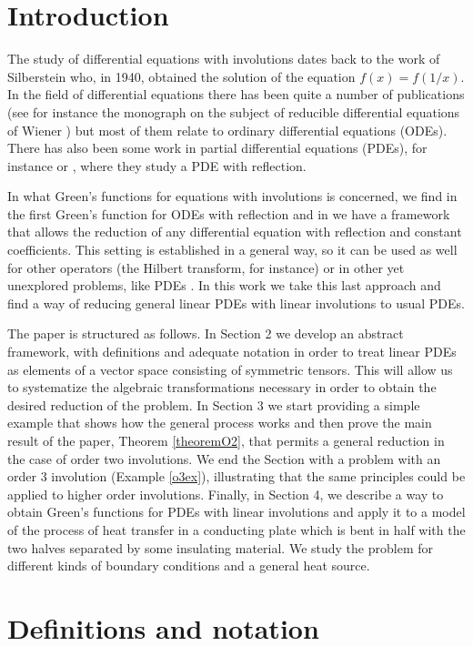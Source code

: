 \documentclass[a4paper,12pt,onecolumn]{article}
\theoremstyle{ptheorem}
\theoremstyle{hdef}
\theoremstyle{premark}
\numberwithin{equation}{section}
\numberwithin{figure}{section}
\newcommand{\<}{\langle}
\renewcommand{\>}{\rangle}
\renewcommand{\<}{\left<}
\renewcommand{\>}{\right>}
\renewcommand{\(}{\left(}
\renewcommand{\)}{\right)}
\begin{document}
\section{Introduction}
The study of differential equations with involutions dates back to the work of Silberstein \cite{Sil} who, in 1940, obtained the solution of the equation $f(x)=f(1/x)$. In the field of differential equations there has been quite a number of publications (see for instance the monograph on the subject of reducible differential equations of Wiener \cite{Wie2}) but most of them relate to ordinary differential equations (ODEs). There has also been some work in partial differential equations (PDEs), for instance \cite{Wie2} or \cite{Bur}, where they study a PDE with reflection.\par
In what Green's functions for equations with involutions is concerned, we find in \cite{Cab4} the first Green's function for ODEs with reflection and in \cite{CTMal} we have a framework that allows the reduction of any differential equation with reflection and constant coefficients. This setting is established in a general way, so it can be used as well for other operators (the Hilbert transform, for instance) or in other yet unexplored problems, like PDEs \cite{Kir}. In this work we take this last approach and find a way of reducing general linear PDEs with linear involutions to usual PDEs.\par
The paper is structured as follows. In Section 2 we develop an abstract framework, with definitions and adequate notation in order to treat linear PDEs as elements of a vector space consisting of symmetric tensors. This will allow us to systematize the algebraic transformations necessary in order to obtain the desired reduction of the problem. In Section 3 we start providing a simple example that shows how the general process works and then prove the main result of the paper, Theorem \ref{theoremO2}, that permits a general reduction in the case of order two involutions. We end the Section with a problem with an order $3$ involution (Example \ref{o3ex}), illustrating that the same principles could be applied to higher order involutions. Finally, in Section 4, we describe a way to obtain Green's functions for PDEs with linear involutions and apply it to a model of the process of heat transfer in a conducting plate which is bent in half with the two halves separated by some insulating material. We study the problem for different kinds of boundary conditions and a general heat source.
\section{Definitions and notation}
\end{document}
